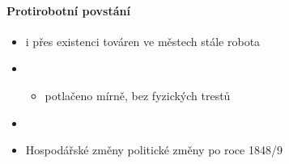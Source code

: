 \paragraph{Protirobotní povstání}
\begin{itemize}
\item i přes existenci továren ve městech stále robota
\item {}	
	\begin{itemize}
	\item potlačeno mírně, bez fyzických trestů
	\end{itemize}
\item {}
\item Hospodářské změny \ra politické změny po roce 1848/9
\end{itemize}



\newpage
\timeline

